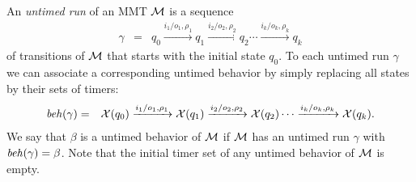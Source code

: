 An \emph{untimed run} of an MMT ${\cal M}$ is a sequence
\begin{eqnarray*}
\gamma & = & q_0 \xrightarrow{i_1/o_1, \rho_1} q_1  \xrightarrow{i_2/o_2, \rho_2} q_2 \cdots \xrightarrow{i_k/o_k, \rho_k} q_k
\end{eqnarray*}
of transitions of ${\cal M}$ that starts with the initial state $q_0$. 
To each untimed run $\gamma$ we can associate a corresponding untimed behavior by simply replacing all
states by their sets of timers:
\begin{eqnarray*}
\mathit{beh}(\gamma) & = & \mathcal{X}(q_0) \xrightarrow{i_1/o_1, \rho_1} \mathcal{X}(q_1)  \xrightarrow{i_2/o_2, \rho_2} \mathcal{X}(q_2) \cdots \xrightarrow{i_k/o_k, \rho_k} \mathcal{X}(q_k).
\end{eqnarray*}
We say that $\beta$ is a untimed behavior of ${\cal M}$ if ${\cal M}$ has an untimed run $\gamma$ with $\mathit{beh}(\gamma) = \beta$.
Note that the initial timer set of any untimed behavior of ${\cal M}$ is empty.

